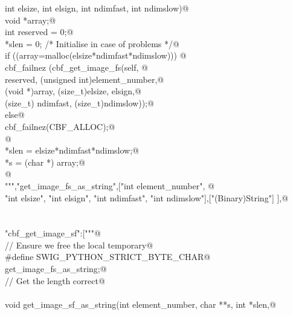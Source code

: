 \documentclass[10pt,a4paper,twoside,notitlepage]{article}
\begin{document}
\begin{flushleft}
\begin{minipage}{\linewidth}
\begin{list}{}{}
\mbox{}\verb@    int elsize, int elsign, int ndimfast, int ndimslow){@\\
\mbox{}\verb@        void *array;@\\
\mbox{}\verb@        int reserved = 0;@\\
\mbox{}\verb@        *slen = 0; /* Initialise in case of problems */@\\
\mbox{}\verb@        if ((array=malloc(elsize*ndimfast*ndimslow))) {@\\
\mbox{}\verb@               cbf_failnez (cbf_get_image_fs(self, @\\
\mbox{}\verb@               reserved, (unsigned int)element_number,@\\
\mbox{}\verb@               (void *)array, (size_t)elsize, elsign,@\\
\mbox{}\verb@               (size_t) ndimfast, (size_t)ndimslow));@\\
\mbox{}\verb@         }else{@\\
\mbox{}\verb@               cbf_failnez(CBF_ALLOC);@\\
\mbox{}\verb@         }@\\
\mbox{}\verb@        *slen = elsize*ndimfast*ndimslow;@\\
\mbox{}\verb@        *s = (char *) array;@\\
\mbox{}\verb@      }@\\
\mbox{}\verb@""","get_image_fs_as_string",["int element_number", @\\
\mbox{}\verb@    "int elsize", "int elsign", "int ndimfast", "int ndimslow"],["(Binary)String"] ],@\\
\mbox{}\verb@@\\
\mbox{}\verb@@\\
\mbox{}\verb@"cbf_get_image_sf":["""@\\
\mbox{}\verb@// Ensure we free the local temporary@\\
\mbox{}\verb@%{@\\
\mbox{}\verb@#define SWIG_PYTHON_STRICT_BYTE_CHAR@\\
\mbox{}\verb@%}@\\
\mbox{}\verb@%cstring_output_allocate_size(char ** s, int *slen, free(*$1))@\\
\mbox{}\verb@       get_image_fs_as_string;@\\
\mbox{}\verb@// Get the length correct@\\
\mbox{}\verb@@\\
\mbox{}\verb@    void get_image_sf_as_string(int element_number, char **s, int *slen,@\\

\end{list}
\end{minipage}
\end{flushleft}
\end{document}
